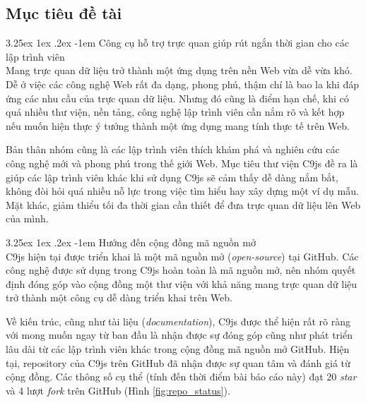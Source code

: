 \documentclass[12pt,a4paper,twoside]{article}
\makeatletter
\newcommand{\myparagraph}[1]{\paragraph{#1}\mbox{}\\} %
\renewcommand\paragraph{\@startsection{paragraph}{5}{\z@}%
  {3.25ex \@plus1ex \@minus.2ex}%
  {-1em}%
  {\normalfont\normalsize\bfseries}}
\makeatother
\begin{document}
\subsection{Mục tiêu đề tài}
\myparagraph{Công cụ hỗ trợ trực quan giúp rút ngắn thời gian cho các lập trình viên}
Mang trực quan dữ liệu trở thành một ứng dụng trên nền Web vừa dễ vừa khó. Dễ ở việc các công nghệ Web rất đa dạng, phong phú, thậm chí là bao la khi đáp ứng các nhu cầu của trực quan dữ liệu. Nhưng đó cũng là điểm hạn chế, khi có quá nhiều thư viện, nền tảng, công nghệ lập trình viên cần nắm rõ và kết hợp nếu muốn hiện thực ý tưởng thành một ứng dụng mang tính thực tế trên Web.

Bản thân nhóm cũng là các lập trình viên thích khám phá và nghiên cứu các công nghệ mới và phong phú trong thế giới Web. Mục tiêu thư viện C9js đề ra là giúp các lập trình viên khác khi sử dụng C9js sẽ cảm thấy dễ dàng nắm bắt, không đòi hỏi quá nhiều nỗ lực trong việc tìm hiểu hay xây dựng một ví dụ mẫu. Mặt khác, giảm thiểu tối đa thời gian cần thiết để đưa trực quan dữ liệu lên Web của mình.

\myparagraph{Hướng đến cộng đồng mã nguồn mở}
C9js hiện tại được triển khai là một mã nguồn mở (\textit{open-source}) tại GitHub\cite{c9js_github}. Các công nghệ được sử dụng trong C9js hoàn toàn là mã nguồn mở, nên nhóm quyết định đóng góp vào cộng đồng một thư viện với khả năng mang trực quan dữ liệu trở thành một công cụ dễ dàng triển khai trên Web. 

Về kiến trúc, cũng như tài liệu (\textit{documentation}), C9js được thể hiện rất rõ ràng với mong muốn ngay từ ban đầu là nhận được sự đóng góp cũng như phát triển lâu dài từ các lập trình viên khác trong cộng đồng mã nguồn mở GitHub. Hiện tại, repository\cite{c9js_repo} của C9js trên GitHub đã nhận được sự quan tâm và đánh giá từ cộng đồng. Các thông số cụ thể (tính đến thời điểm bài báo cáo này) đạt 20 \textit{star} và 4 lượt \textit{fork} trên GitHub (Hình \ref{fig:repo_status}).

\end{document}
